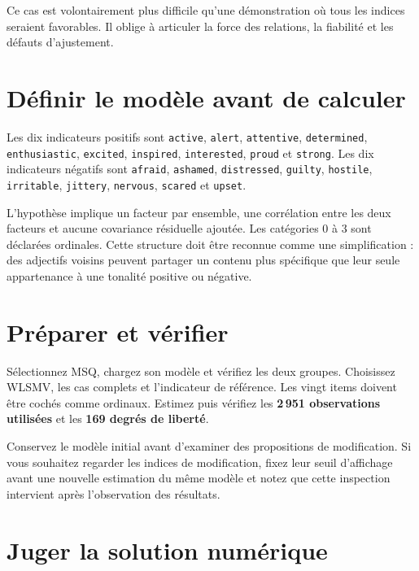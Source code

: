 \documentclass[
  french,
  11pt,
  a4paper,
  DIV=11,
  numbers=noendperiod]{scrreprt}
\begin{document}
Ce cas est volontairement plus difficile qu'une démonstration où tous
les indices seraient favorables. Il oblige à articuler la force des
relations, la fiabilité et les défauts d'ajustement.

\section{Définir le modèle avant de
calculer}\label{duxe9finir-le-moduxe8le-avant-de-calculer}

Les dix indicateurs positifs sont \texttt{active}, \texttt{alert},
\texttt{attentive}, \texttt{determined}, \texttt{enthusiastic},
\texttt{excited}, \texttt{inspired}, \texttt{interested}, \texttt{proud}
et \texttt{strong}. Les dix indicateurs négatifs sont \texttt{afraid},
\texttt{ashamed}, \texttt{distressed}, \texttt{guilty},
\texttt{hostile}, \texttt{irritable}, \texttt{jittery},
\texttt{nervous}, \texttt{scared} et \texttt{upset}.

L'hypothèse implique un facteur par ensemble, une corrélation entre les
deux facteurs et aucune covariance résiduelle ajoutée. Les catégories 0
à 3 sont déclarées ordinales. Cette structure doit être reconnue comme
une simplification : des adjectifs voisins peuvent partager un contenu
plus spécifique que leur seule appartenance à une tonalité positive ou
négative.

\section{Préparer et vérifier}\label{pruxe9parer-et-vuxe9rifier}

Sélectionnez MSQ, chargez son modèle et vérifiez les deux groupes.
Choisissez WLSMV, les cas complets et l'indicateur de référence. Les
vingt items doivent être cochés comme ordinaux. Estimez puis vérifiez
les \textbf{2\,951 observations utilisées} et les \textbf{169 degrés de
liberté}.

Conservez le modèle initial avant d'examiner des propositions de
modification. Si vous souhaitez regarder les indices de modification,
fixez leur seuil d'affichage avant une nouvelle estimation du même
modèle et notez que cette inspection intervient après l'observation des
résultats.

\section{Juger la solution
numérique}\label{juger-la-solution-numuxe9rique}
\end{document}
